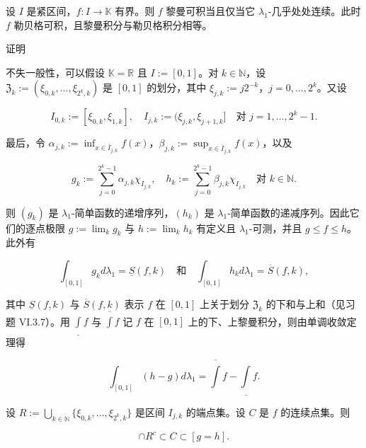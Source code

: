 \begin{theorem}

设 $ I $ 是紧区间，$ f: I \to \mathbb{K} $ 有界。则 $ f $ 黎曼可积当且仅当它 $ \lambda_{1} $-几乎处处连续。此时 $ f $ 勒贝格可积，且黎曼积分与勒贝格积分相等。

证明

\begin{subitems}
\item

不失一般性，可以假设 $ \mathbb{K} = \mathbb{R} $ 且 $ I := [0,1] $。对 $ k \in \mathbb{N} $，设 $ \mathfrak{Z}_{k} := (\xi_{0,k},\ldots,\xi_{2^{k},k}) $ 是 $ [0,1] $ 的划分，其中 $ \xi_{j,k} := j2^{-k} $，$ j = 0,\ldots,2^{k} $。又设

\[
I_{0,k} := [\xi_{0,k},\xi_{1,k}] , \quad I_{j,k} := (\xi_{j,k},\xi_{j+1,k}] \quad \text{对 } j = 1,\ldots,2^{k}-1 .
\]

最后，令 $ \alpha_{j,k} := \inf_{x \in \overline{I}_{j,k}} f(x) $，$ \beta_{j,k} := \sup_{x \in \overline{I}_{j,k}} f(x) $，以及

\[
g_{k} := \sum_{j=0}^{2^{k}-1} \alpha_{j,k}\chi_{I_{j,k}} , \quad h_{k} := \sum_{j=0}^{2^{k}-1} \beta_{j,k}\chi_{I_{j,k}} \quad \text{对 } k \in \mathbb{N} .
\]

则 $ (g_{k}) $ 是 $ \lambda_{1} $-简单函数的递增序列，$ (h_{k}) $ 是 $ \lambda_{1} $-简单函数的递减序列。因此它们的逐点极限 $ g := \lim_{k} g_{k} $ 与 $ h := \lim_{k} h_{k} $ 有定义且 $ \lambda_{1} $-可测，并且 $ g \le f \le h $。此外有

\[
\int_{[0,1]} g_{k} d\lambda_{1} = \underline{S}(f,k) \quad \text{和} \quad \int_{[0,1]} h_{k} d\lambda_{1} = \overline{S}(f,k) ,
\]

其中 $ \underline{S}(f,k) $ 与 $ \overline{S}(f,k) $ 表示 $ f $ 在 $ [0,1] $ 上关于划分 $ \mathfrak{Z}_{k} $ 的下和与上和（见习题 VI.3.7）。用 $ \underline{\int} f $ 与 $ \overline{\int} f $ 记 $ f $ 在 $ [0,1] $ 上的下、上黎曼积分，则由单调收敛定理得

\begin{equation}
\int_{[0,1]} (h-g) d\lambda_{1} = \overline{\int} f - \underline{\int} f .\tag{5.3}
\end{equation}
\item

设 $ R := \bigcup_{k \in \mathbb{N}} \{\xi_{0,k},\ldots,\xi_{2^{k},k}\} $ 是区间 $ I_{j,k} $ 的端点集。设 $ C $ 是 $ f $ 的连续点集。则

\begin{equation}
[g = h] \cap R^{c} \subset C \subset [g = h] .\tag{5.4}
\end{equation}


\end{subitems}
\end{theorem}
